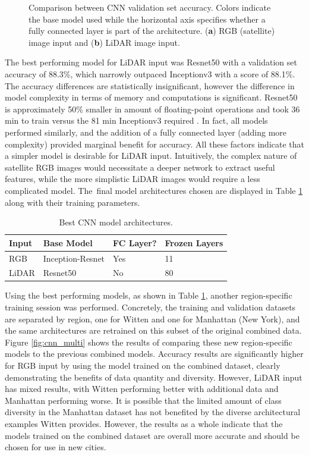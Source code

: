 \begin{figure}[ht]
    \caption[Results of CNN networks on validation set]{Comparison between CNN validation set accuracy. Colors indicate the base model used while the horizontal axis specifies whether a fully connected layer is part of the architecture. (\textbf{a}) RGB (satellite) image input and (\textbf{b}) LiDAR image input.}
    \label{fig:cnn_val}
\end{figure}

The best performing model for LiDAR input was  Resnet50 with a validation set accuracy of 88.3\%, which narrowly outpaced Inceptionv3 with a score of 88.1\%. The accuracy differences are statistically insignificant, however the difference in model complexity in terms of memory and computations is significant.  Resnet50 is approximately 50\% smaller in amount of floating-point operations and took 36 min to train versus the 81 min Inceptionv3 required \cite{canziani_analysis_2017}.  In fact, all models performed similarly, and the addition of a fully connected layer (adding more complexity) provided marginal benefit for accuracy. All these factors indicate that a simpler model is desirable for LiDAR input.  Intuitively, the complex nature of satellite RGB images would necessitate a deeper network to extract useful features, while the more simplistic LiDAR images would require a less complicated model. The~final model architectures chosen are displayed in Table \ref{table:best_cnn_arch} along with their training parameters.

\begin{table}[H]
\centering
\caption{Best CNN model architectures.}\label{table:best_cnn_arch}
\begin{tabular}{llll}
\toprule
\textbf{Input} & \textbf{Base Model}       & \textbf{FC Layer?} & \textbf{Frozen Layers} \\ \midrule
RGB   & Inception-Resnet & Yes       & 11            \\
LiDAR & Resnet50         & No        & 80   \\
\bottomrule        
\end{tabular}
\end{table}


Using the best performing models, as shown in Table \ref{table:best_cnn_arch}, another region-specific training session was performed.  Concretely, the training and validation datasets are separated by region, one for Witten and one for Manhattan (New York), and the same architectures are retrained on this subset of the original combined data. Figure \ref{fig:cnn_multi} shows the results of comparing these new region-specific models to the previous combined models.  Accuracy results are significantly higher for RGB input by using the model trained on the combined dataset, clearly demonstrating the benefits of data quantity and diversity. However, LiDAR input has mixed results, with Witten performing better with additional data and Manhattan performing worse. It is possible that the limited amount of class diversity in the Manhattan dataset has not benefited by the diverse architectural examples Witten provides. However, the results as a whole indicate that the models trained on the combined dataset are overall more accurate and should be chosen for use in new cities. 

